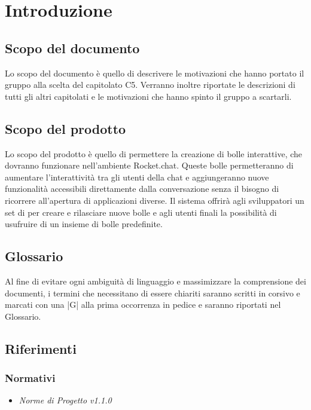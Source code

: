\section{Introduzione}

\subsection{Scopo del documento}

Lo scopo del documento è quello di descrivere le motivazioni che hanno portato il gruppo alla
scelta del capitolato C5.
Verranno inoltre riportate le descrizioni di tutti gli altri capitolati e le motivazioni che hanno
spinto il gruppo a scartarli.

\subsection{Scopo del prodotto}

Lo scopo del prodotto è quello di permettere la creazione di bolle
interattive, che dovranno funzionare nell’ambiente Rocket.chat. Queste
bolle permetteranno di aumentare l'interattività tra gli utenti della
chat e aggiungeranno nuove funzionalità accessibili
direttamente dalla conversazione senza il bisogno di ricorrere
all'apertura di applicazioni diverse. 
Il sistema offrirà agli sviluppatori un set di  per creare e
rilasciare nuove bolle e agli utenti finali la possibilità di
usufruire di un insieme di bolle predefinite.  

\subsection{Glossario}

Al fine di evitare ogni ambiguità di linguaggio e massimizzare la
comprensione dei documenti, i termini che necessitano di essere
chiariti saranno scritti in corsivo e marcati con una |G| alla prima
occorrenza in pedice e
saranno riportati nel Glossario. 

\subsection{Riferimenti}

\subsubsection{Normativi}
\begin{itemize}
	\item \emph{Norme di Progetto v1.1.0}
\end{itemize}

